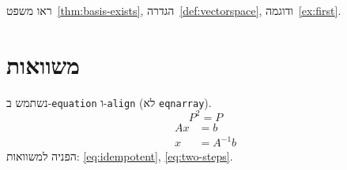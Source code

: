 \documentclass[12pt]{book}
\theoremstyle{plain}
\theoremstyle{definition}
\begin{document}
ראו משפט~\ref{thm:basis-exists}, הגדרה~\ref{def:vectorspace}, ודוגמה~\ref{ex:first}.

\section{משוואות}
נשתמש ב-\verb|equation| ו-\verb|align| (לא \verb|eqnarray|).
\begin{equation}\label{eq:idempotent}
P^2 = P
\end{equation}
\begin{align}\label{eq:two-steps}
Ax &= b\\
x  &= A^{-1}b
\end{align}
הפניה למשוואות: \eqref{eq:idempotent}, \eqref{eq:two-steps}.

\backmatter
\end{document}
